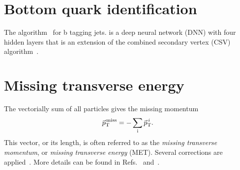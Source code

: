 \section{Bottom quark identification} \label{sec:btagging}



The \DeepCSV algorithm~\cite{btag_deepCSV,btag_2018} for b tagging jets. \DeepCSV is a deep neural network (DNN) with four hidden layers that is an extension of the combined secondary vertex (CSV) algorithm~\cite{btag_deepCSV,btag_2018}.


\section{Missing transverse energy}\label{sec:met}



The vectorially sum of all particles gives the missing momentum
\begin{equation} \label{eq:MET}
  {\vec{\mkern0mup}}_{\mathrm{T}}^{\kern1pt\text{miss}} = - \sum_{\text{i}}\vec{\mkern0mup}_\text{T}^{\,i}.
\end{equation}
This vector, or its length, is often referred to as the \emph{missing transverse momentum}, or \emph{missing transverse energy} (MET).
Several corrections are applied~\cite{PF2017}.
More details can be found in Refs.~\cite{CMS-PAS-JME-16-004} and~\cite{CMS-PAS-JME-17-001}. 

